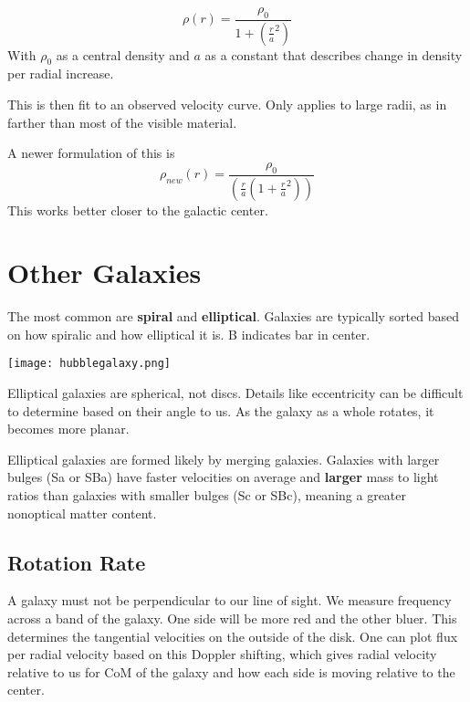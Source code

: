 \begin{equation}
	\label{}
	\rho(r)=\frac{\rho_{0}}{1+(\frac{r}{a}^{2})}
\end{equation}
With $\rho_{0}$ as a central density and $a$ as a constant that describes change in density per radial increase.

This is then fit to an observed velocity curve. Only applies to large radii, as in farther than most of the visible material. 

A newer formulation of this is 
\begin{equation}
	\label{}
	\rho_{new}(r)=\frac{\rho_{0}}{(\frac{r}{a}(1+\frac{r}{a}^{2}))}
\end{equation}
This works better closer to the galactic center.


\section{Other Galaxies} The most common are \textbf{spiral} and \textbf{elliptical}. Galaxies are typically sorted based on how spiralic and how elliptical it is. B indicates bar in center. 


	\texttt{[image: hubblegalaxy.png]}

Elliptical galaxies are spherical, not discs. Details like eccentricity can be difficult to determine based on their angle to us. As the galaxy as a whole rotates, it becomes more planar. 

Elliptical galaxies are formed likely by merging galaxies. Galaxies with larger bulges (Sa or SBa) have faster velocities on average and \textbf{larger} mass to light ratios than galaxies with smaller bulges (Sc or SBc), meaning a greater nonoptical matter content.








\subsection{Rotation Rate}
A galaxy must not be perpendicular to our line of sight. We measure frequency across a band of the galaxy. One side will be more red and the other bluer. This determines the tangential velocities on the outside of the disk. One can plot flux per radial velocity based on this Doppler shifting, which gives radial velocity relative to us for CoM of the galaxy and how each side is moving relative to the center.

